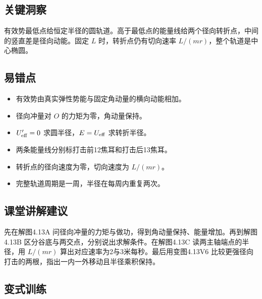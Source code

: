 \documentclass[UTF8,fontset=fandol,a4paper,11pt]{ctexart}
\begin{document}


\subsection*{关键洞察}

有效势最低点给恒定半径的圆轨道。高于最低点的能量线给两个径向转折点，中间的竖直差是径向动能。固定 $L$ 时，转折点仍有切向速率 $L/(mr)$，整个轨道是中心椭圆。



\subsection*{易错点}

\begin{itemize}
\item 有效势由真实弹性势能与固定角动量的横向动能相加。
\item 径向冲量对 $O$ 的力矩为零，角动量保持。
\item $U'_{\rm eff}=0$ 求圆半径，$E=U_{\rm eff}$ 求转折半径。
\item 两条能量线分别标打击前12焦耳和打击后13焦耳。
\item 转折点的径向速度为零，切向速度为 $L/(mr)$。
\item 完整轨道周期是一周，半径在每周内重复两次。
\end{itemize}



\subsection*{课堂讲解建议}

先在解图4.13A 问径向冲量的力矩与做功，得到角动量保持、能量增加。再到解图4.13B 区分谷底与两交点，分别说出求解条件。在解图4.13C 读两主轴端点的半径，用 $L/(mr)$ 算出对应速率为2与3米每秒。最后用变图4.13V6 比较更强径向打击的两根，指出一内一外移动且半径乘积保持。



\subsection*{变式训练}
\end{document}

